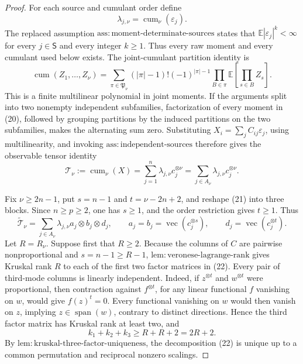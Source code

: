 \documentclass{article}
\begin{document}
\begin{proof}
For each source and cumulant order define
\[
 \lambda_{j,\nu}=\operatorname{cum}_\nu(\varepsilon_j).
\]
The replaced assumption \(\mathrm{ass{:}moment\text{-}determinate\text{-}sources}\) states that \(\mathbb E|\varepsilon_j|^k<\infty\) for every \(j\in\mathsf S\) and every integer \(k\ge1\). Thus every raw moment and every cumulant used below exists. The joint-cumulant partition identity is
\[
 \operatorname{cum}(Z_1,\ldots,Z_\nu)
 =\sum_{\pi\in\mathfrak P_\nu}
 (|\pi|-1)!(-1)^{|\pi|-1}
 \prod_{B\in\pi}\mathbb E\!\left[\prod_{s\in B}Z_s\right]. \tag{20}
\]
This is a finite multilinear polynomial in joint moments. If the arguments split into two nonempty independent subfamilies, factorization of every moment in (20), followed by grouping partitions by the induced partitions on the two subfamilies, makes the alternating sum zero. Substituting \(X_i=\sum_j C_{ij}\varepsilon_j\), using multilinearity, and invoking \(\mathrm{ass{:}independent\text{-}sources}\) therefore gives the observable tensor identity
\[
 \mathcal T_\nu:=\operatorname{cum}_\nu(X)
 =\sum_{j=1}^n\lambda_{j,\nu}c_j^{\otimes\nu}
 =\sum_{j\in A_\nu}\lambda_{j,\nu}c_j^{\otimes\nu}. \tag{21}
\]

Fix \(\nu\ge2n-1\), put \(s=n-1\) and \(t=\nu-2n+2\), and reshape (21) into three blocks. Since \(n\ge p\ge2\), one has \(s\ge1\), and the order restriction gives \(t\ge1\). Thus
\[
 \widetilde{\mathcal T}_\nu
 =\sum_{j\in A_\nu}\lambda_{j,\nu}
 a_j\otimes b_j\otimes d_j,
 \qquad
 a_j=b_j=\operatorname{vec}(c_j^{\otimes s}),
 \qquad
 d_j=\operatorname{vec}(c_j^{\otimes t}). \tag{22}
\]
Let \(R=R_\nu\). Suppose first that \(R\ge2\). Because the columns of \(C\) are pairwise nonproportional and \(s=n-1\ge R-1\), \(\mathrm{lem{:}veronese\text{-}lagrange\text{-}rank}\) gives Kruskal rank \(R\) to each of the first two factor matrices in (22). Every pair of third-mode columns is linearly independent. Indeed, if \(z^{\otimes t}\) and \(w^{\otimes t}\) were proportional, then contraction against \(f^{\otimes t}\), for any linear functional \(f\) vanishing on \(w\), would give \(f(z)^t=0\). Every functional vanishing on \(w\) would then vanish on \(z\), implying \(z\in\operatorname{span}(w)\), contrary to distinct directions. Hence the third factor matrix has Kruskal rank at least two, and
\[
 k_1+k_2+k_3\ge R+R+2=2R+2. \tag{23}
\]
By \(\mathrm{lem{:}kruskal\text{-}three\text{-}factor\text{-}uniqueness}\), the decomposition (22) is unique up to a common permutation and reciprocal nonzero scalings.


\end{proof}
\end{document}

